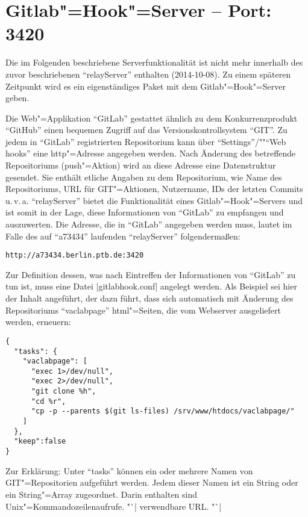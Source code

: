 \documentclass[titlepage=false,toc=nobibliography]{vl-report}
\newcommand*\theServer{relayServer}
\begin{document}
\section{Gitlab"=Hook"=Server -- Port: 3420}

 Die im Folgenden beschriebene Serverfunktionalität ist
nicht mehr innerhalb des zuvor beschriebenen  "`\theServer"' enthalten
(2014-10-08). Zu einem späteren Zeitpunkt wird es ein eigenständiges Paket mit
dem Gitlab"=Hook"=Server geben.

\bigskip

\noindent Die Web"=Applikation "`GitLab"' gestattet ähnlich zu dem Konkurrenzprodukt
"`GitHub"' einen bequemen Zugriff auf das Versionskontrollsystem "`GIT"'. Zu
jedem  in "`GitLab"' registrierten Repositorium kann über
"`Settings"'/"""`Web hooks"' eine http"=Adresse angegeben werden. Nach
Änderung des betreffende Repositoriums (push"=Aktion) wird an diese Adresse
eine Datenstruktur gesendet. Sie enthält etliche Angaben zu dem
Repositorium, wie Name des Repositoriums, URL für GIT"=Aktionen, Nutzername,
IDs der letzten Commits u.\,v.\,a. "`\theServer"' bietet die
Funktionalität eines Gitlab"=Hook"=Servers und ist somit in der Lage, diese
Informationen von "`GitLab"' zu empfangen und auszuwerten. Die Adresse, die
in "`GitLab"' angegeben werden muss, lautet im Falle des auf "`a73434"'
laufenden "`\theServer"' folgendermaßen:
\begin{lstlisting}[language={}]
  http://a73434.berlin.ptb.de:3420
\end{lstlisting}
Zur Definition dessen, was nach Eintreffen der
Informationen von "`GitLab"' zu tun ist, muss eine Datei |gitlabhook.conf|
angelegt werden. Als Beispiel sei hier der Inhalt angeführt, der dazu führt,
dass sich automatisch mit Änderung des Repositoriums "`vaclabpage"'
html"=Seiten, die vom Webserver ausgeliefert werden, erneuern:
\begin{lstlisting}[language={}]
{
  "tasks": {
    "vaclabpage": [
      "exec 1>/dev/null",
      "exec 2>/dev/null",
      "git clone %h",
      "cd %r",
      "cp -p --parents $(git ls-files) /srv/www/htdocs/vaclabpage/"
    ]
  },
  "keep":false
}
\end{lstlisting}%
%
Zur Erklärung: Unter "`tasks"' können ein oder mehrere Namen von
GIT"=Repositorien aufgeführt werden. Jedem dieser Namen ist ein String oder
ein String"=Array zugeordnet. Darin enthalten sind Unix"=Kommandozeilenaufrufe.
"`|%
verwendbare URL. "`|%
\end{document}
